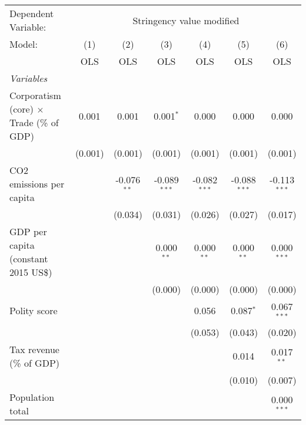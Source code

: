 
\begingroup
\centering
\begin{tabular}{lcccccc}
   \toprule
   Dependent Variable: & \multicolumn{6}{c}{Stringency value modified}\\
   Model:                                          & (1)     & (2)           & (3)            & (4)            & (5)            & (6)\\  
                                                   &  OLS    & OLS           & OLS            & OLS            & OLS            & OLS\\  
   \midrule
   \emph{Variables}\\
   Corporatism (core) $\times$ Trade (\% of GDP)   & 0.001   & 0.001         & 0.001$^{*}$    & 0.000          & 0.000          & 0.000\\   
                                                   & (0.001) & (0.001)       & (0.001)        & (0.001)        & (0.001)        & (0.001)\\   
   CO2 emissions per capita                        &         & -0.076$^{**}$ & -0.089$^{***}$ & -0.082$^{***}$ & -0.088$^{***}$ & -0.113$^{***}$\\   
                                                   &         & (0.034)       & (0.031)        & (0.026)        & (0.027)        & (0.017)\\   
   GDP per capita (constant 2015 US\$)             &         &               & 0.000$^{**}$   & 0.000$^{**}$   & 0.000$^{**}$   & 0.000$^{***}$\\   
                                                   &         &               & (0.000)        & (0.000)        & (0.000)        & (0.000)\\   
   Polity score                                    &         &               &                & 0.056          & 0.087$^{*}$    & 0.067$^{***}$\\   
                                                   &         &               &                & (0.053)        & (0.043)        & (0.020)\\   
   Tax revenue (\% of GDP)                         &         &               &                &                & 0.014          & 0.017$^{**}$\\   
                                                   &         &               &                &                & (0.010)        & (0.007)\\   
   Population total                                &         &               &                &                &                & 0.000$^{***}$\\   

\end{tabular}
